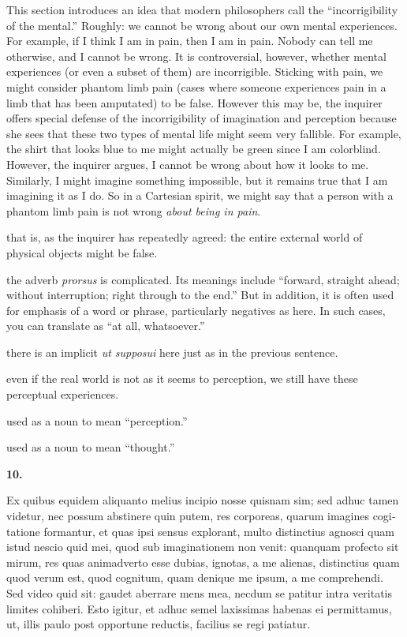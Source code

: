  This section introduces an idea that modern philosophers call the ``incorrigibility of the mental.'' Roughly: we cannot be wrong about our own mental experiences. For example, if I think I am in pain, then I am in pain. Nobody can tell me otherwise, and I cannot be wrong. It is controversial, however, whether mental experiences (or even a subset of them) are incorrigible. Sticking with pain, we might consider phantom limb pain (cases where someone experiences pain in a limb that has been amputated) to be false. However this may be, the inquirer offers special defense of the incorrigibility of imagination and perception because she sees that these two types of mental life might seem very fallible. For example, the shirt that looks blue to me might actually be green since I am colorblind. However, the inquirer argues, I cannot be wrong about how it looks to me. Similarly, I might imagine something impossible, but it remains true that I am imagining it as I do. So in a Cartesian spirit, we might say that a person with a phantom limb pain is not wrong \textit{about being in pain}.

 that is, as the inquirer has repeatedly agreed: the entire external world of physical objects might be false.

 the adverb \textit{prorsus} is complicated. Its meanings include ``forward, straight ahead; without interruption; right through to the end.'' But in addition, it is often used for emphasis of a word or phrase, particularly negatives as here. In such cases, you can translate as ``at all, whatsoever.''

 there is an implicit \textit{ut supposui} here just as in the previous sentence.

 even if the real world is not as it seems to perception, we still have these perceptual experiences.

 used as a noun to mean ``perception.''

 used as a noun to mean ``thought.''

\clearpage

\beginnumbering
\pstart
    \textbf{10.} \begin{latin}Ex quibus equidem aliquanto melius incipio nosse quisnam sim; sed adhuc tamen videtur, nec possum abstinere quin putem, res corporeas, quarum imagines cogitatione formantur, et quas ipsi sensus explorant, multo distinctius agnosci quam istud nescio quid mei, quod sub imaginationem non venit: quanquam profecto sit mirum, res quas animadverto esse dubias, ignotas, a me alienas, distinctius quam quod verum est, quod cognitum, quam denique me ipsum, a me comprehendi. Sed video quid sit: gaudet aberrare mens mea, necdum se patitur intra veritatis limites cohiberi. Esto igitur, et adhuc semel laxissimas habenas ei permittamus, ut, illis paulo post opportune reductis, facilius se regi patiatur.\end{latin}
\pend
\endnumbering

